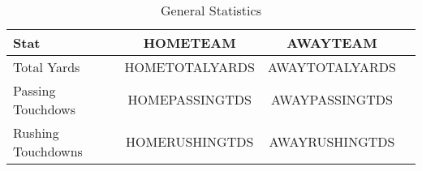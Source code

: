 \begin{table}[htbp]\
\def\sym#1{\ifmmode^{#1}\else\(^{#1}\)\fi}
\caption{General Statistics\label{tab1}}
{
\centering
\begin{tabular}{l*{3}{c}}
\hline\hline
Stat&\multicolumn{1}{c}{
HOMETEAM
}&\multicolumn{1}{c}{
AWAYTEAM
}\\
\hline
Total Yards&     HOMETOTALYARDS&    AWAYTOTALYARDS\\
[1em]
Passing Touchdows&     HOMEPASSINGTDS&    AWAYPASSINGTDS\\
[1em]
Rushing Touchdowns&    HOMERUSHINGTDS&    AWAYRUSHINGTDS\\
\hline\hline
\end{tabular}
}
\label{tab:glance}
\end{table}
